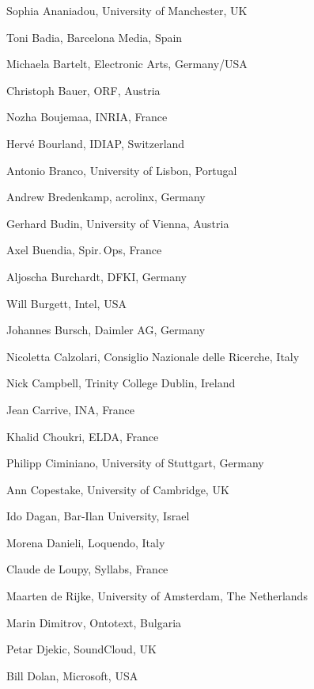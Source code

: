 \documentclass[10pt, plain]{../../metanetpaper}
\begin{document}

\begin{multicols}{3}
\begin{small}
  \begin{enumerate}
    \raggedright{
      \item Sophia Ananiadou, University of Manchester, UK
      \item Toni Badia, Barcelona Media, Spain
      \item Michaela Bartelt, Electronic Arts, Germany/USA
      \item Christoph Bauer, ORF, Austria
      \item Nozha Boujemaa, INRIA, France
      \item Hervé Bourland, IDIAP, Switzerland
      \item Antonio Branco, University of Lisbon, Portugal
      \item Andrew Bredenkamp, acrolinx, Germany
      \item Gerhard Budin, University of Vienna, Austria
      \item Axel Buendia, Spir.\,Ops, France
      \item Aljoscha Burchardt, DFKI, Germany
      \item Will Burgett, Intel, USA
      \item Johannes Bursch, Daimler AG, Germany
      \item Nicoletta Calzolari, Consiglio Nazionale delle Ricerche, Italy
      \item Nick Campbell, Trinity College Dublin, Ireland
      \item Jean Carrive, INA, France
      \item Khalid Choukri, ELDA, France
      \item Philipp Ciminiano, University of Stuttgart, Germany
      \item Ann Copestake, University of Cambridge, UK
      \item Ido Dagan, Bar-Ilan University, Israel
      \item Morena Danieli, Loquendo, Italy
      \item Claude de Loupy, Syllabs, France
      \item Maarten de Rijke, University of Amsterdam, The Netherlands
      \item Marin Dimitrov, Ontotext, Bulgaria
      \item Petar Djekic, SoundCloud, UK
      \item Bill Dolan, Microsoft, USA
}
\end{enumerate}
\end{small}
\end{multicols}
\end{document}
